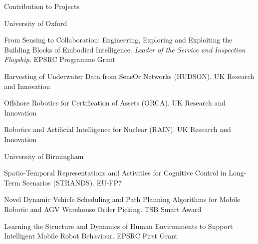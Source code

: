 
\begin{rSection}{Contribution to Projects}

\begin{rSubsection}{University of Oxford}{}{}{}
\item From Sensing to Collaboration: Engineering, Exploring and Exploiting the Building Blocks of Embodied Intelligence. \emph{Leader of the Service and Inspection Flagship.} EPSRC Programme Grant
\item Harvesting of Underwater Data from SensOr Networks (HUDSON). UK Research and Innovation
\item Offshore Robotics for Certification of Assets (ORCA). UK Research and Innovation
\item Robotics and Artificial Intelligence for Nuclear (RAIN). UK Research and Innovation
\end{rSubsection}

\begin{rSubsection}{University of Birmingham}{}{}{}
\item Spatio-Temporal Representations and Activities for Cognitive Control in Long-Term
Scenarios (STRANDS). EU-FP7
\item Novel Dynamic Vehicle Scheduling and Path Planning Algorithms for Mobile Robotic
and AGV Warehouse Order Picking. TSB Smart Award
\item Learning the Structure and Dynamics of Human Environments to Support Intelligent
Mobile Robot Behaviour. EPSRC First Grant
\end{rSubsection}



\end{rSection}
